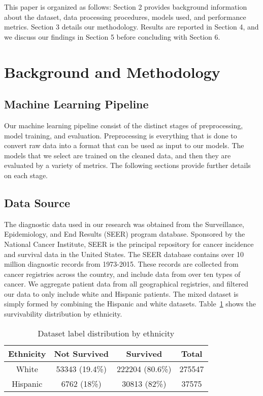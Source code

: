 \documentclass[review]{elsarticle}
\begin{document}
This paper is organized as follows: Section 2 provides background information about the dataset, data processing procedures, models used, and performance metrics. Section 3 details our methodology. Results are reported in Section 4, and we discuss our findings in Section 5 before concluding with Section 6.
\section{Background and Methodology}

\subsection*{Machine Learning Pipeline}
Our machine learning pipeline consist of the distinct stages of preprocessing, model training, and evaluation. Preprocessing is everything that is done to convert raw data into a format that can be used as input to our models. The models that we select are trained on the cleaned data, and then they are evaluated by a variety of metrics. The following sections provide further details on each stage.
\subsection*{Data Source}
The diagnostic data used in our research was obtained from the Surveillance, Epidemiology, and End Results (SEER) program database\cite{seer-dataset}. Sponsored by the National Cancer Institute, SEER is the principal repository for cancer incidence and survival data in the United States. The SEER database contains over 10 million diagnostic records from 1973-2015. These records are collected from cancer registries across the country, and include data from over ten types of cancer. We aggregate patient data from all geographical registries, and filtered our data to only include white and Hispanic patients. The mixed dataset is simply formed by combining the Hispanic and white datasets. Table~\ref{dataset-info} shows the survivability distribution by ethnicity.

\begin{table}[H]
	\centering
	\caption{Dataset label distribution by ethnicity}
	\begin{tabular}{cccc}
		\textbf{Ethnicity} & \textbf{Not Survived} & \textbf{Survived} & \textbf{Total} \\ 
		\hline
		White              & 53343 (19.4\%)   & 222204 (80.6\%)        &  275547  \\
		Hispanic           & 6762 (18\%)       & 30813 (82\%)           &  37575 \\
	\end{tabular}
	
	\label{dataset-info}
\end{table}
\end{document}
